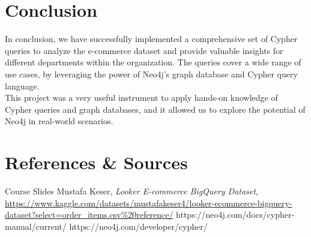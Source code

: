 \documentclass[a4paper,12pt]{article}
\begin{document}
\section{Conclusion}
In conclusion, we have successfully implemented a comprehensive set of Cypher queries to analyze the e-commerce dataset and provide valuable insights for different departments within the organization. The queries cover a wide range of use cases, by leveraging the power of Neo4j's graph database and Cypher query language. 
\\
This project was a very useful instrument to apply hands-on knowledge of Cypher queries and graph databases, and it allowed us to explore the potential of Neo4j in real-world scenarios. 


\newpage
\section{References \& Sources}
  \begin{thebibliography}{9}
    \bibitem{} Course Slides
     Mustafa Keser, \emph{Looker E-commerce BigQuery Dataset}, \url{https://www.kaggle.com/datasets/mustafakeser4/looker-ecommerce-bigquery-dataset?select=order_items.csv%20reference/}
    \bibitem{} https://neo4j.com/docs/cypher-manual/current/
    \bibitem{} https://neo4j.com/developer/cypher/
  \end{thebibliography}
\end{document}
